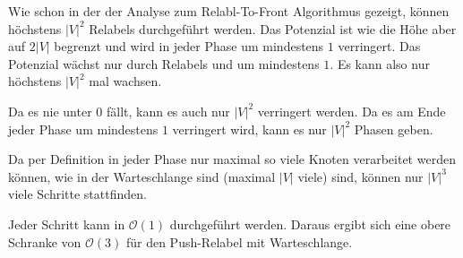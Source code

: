 \documentclass[parskip=half,a4paper]{scrartcl}
\begin{document}
Wie schon in der der Analyse zum Relabl-To-Front Algorithmus gezeigt, können höchstens $|V|^2$ Relabels durchgeführt werden. Das Potenzial ist wie die Höhe aber auf $2|V|$ begrenzt und wird in jeder Phase um mindestens $1$ verringert. Das Potenzial wächst nur durch Relabels und um mindestens $1$. Es kann also nur höchstens $|V|^2$ mal wachsen.

Da es nie unter $0$ fällt, kann es auch nur $|V|^2$ verringert werden. Da es am Ende jeder Phase um mindestens $1$ verringert wird, kann es nur $|V|^2$ Phasen geben.

Da per Definition in jeder Phase nur maximal so viele Knoten verarbeitet werden können, wie in der Warteschlange sind (maximal $|V|$ viele) sind, können nur $|V|^3$ viele Schritte stattfinden.

Jeder Schritt kann in $\mathcal{O}(1)$ durchgeführt werden. Daraus ergibt sich eine obere Schranke von $\mathcal{O}(3)$ für den Push-Relabel mit Warteschlange.
\end{document}
